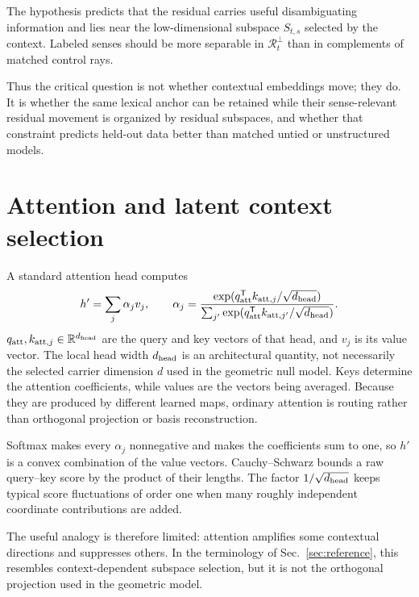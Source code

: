 \documentclass[
  aps,
  reprint,
  superscriptaddress,
  floatfix,
  nofootinbib,
  longbibliography
]{revtex4-2}
\newcommand{\R}{\mathbb{R}}
\newcommand{\T}{^{\mathsf{T}}}
\begin{document}
The hypothesis predicts that the residual carries useful disambiguating
information and lies near the low-dimensional subspace $S_{t,s}$ selected by the
context.  Labeled senses should be more separable in $\mathcal R_t^\perp$ than
in complements of matched control rays.

Thus the critical question is not whether contextual embeddings move; they
do.  It is whether the same lexical anchor can be retained while their
sense-relevant residual movement is organized by residual subspaces, and whether
that constraint predicts held-out data better than matched untied or
unstructured models.

\section{Attention and latent context selection}
\label{sec:attention}

A standard attention head computes
%
\begin{equation}
\label{eq:attention}
h'=\sum_j\alpha_j v_j,
\qquad
\alpha_j=
\frac{\exp(q_{\rm att}\T k_{{\rm att},j}/\sqrt{d_{\rm head}})}
{\sum_{j'}\exp(q_{\rm att}\T k_{{\rm att},j'}/\sqrt{d_{\rm head}})} .
\end{equation}
%
$q_{\rm att},k_{{\rm att},j}\in\R^{d_{\rm head}}$ are the query and key
vectors of that head, and $v_j$ is its value vector.  The local head width
$d_{\rm head}$ is an architectural
quantity, not necessarily the selected carrier dimension $d$ used in the
geometric null model.
Keys determine the attention coefficients, while values are the vectors being
averaged.  Because they are produced by different learned maps, ordinary
attention is routing rather than orthogonal projection or basis
reconstruction.

Softmax makes every $\alpha_j$ nonnegative and makes the coefficients sum to
one, so $h'$ is a convex combination of the value vectors.  Cauchy--Schwarz
bounds a raw query--key score by the product of their lengths.  The factor
$1/\sqrt{d_{\rm head}}$ keeps typical score fluctuations of order one when
many roughly independent coordinate contributions are added.

The useful analogy is therefore limited: attention amplifies some contextual
directions and suppresses others.  In the terminology of
Sec.~\ref{sec:reference}, this resembles context-dependent subspace selection,
but it is not the orthogonal projection used in the geometric model.
\end{document}
